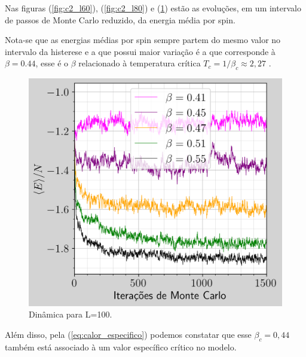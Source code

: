 Nas figuras (\ref{fig:c2_l60}), (\ref{fig:c2_l80}) e (\ref{fig:c2_l100}) estão 
as evoluções, em um intervalo de passos de Monte Carlo reduzido, da energia média por spin. 

\clearpage
Nota-se que as energias médias por spin sempre partem do mesmo valor no intervalo da histerese e a 
que possui maior variação é a que corresponde à $\beta = 0.44$, esse é o $\beta$ relacionado à temperatura crítica $T_c = 1/\beta_c \approx 2,27$ .

\begin{figure}
    \centering
    \includegraphics[width=0.5\linewidth]{graficos/tarefa-3/graf-tarefa-C2-L100.png}
    \caption{Dinâmica para L=100.}
    \label{fig:c2_l100}
\end{figure}

Além disso, pela (\ref{eq:calor_especifico}) podemos constatar que esse $\beta_c = 0,44$ também está associado à 
um valor específico crítico no modelo. 